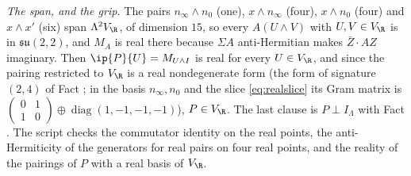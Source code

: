 \emph{The span, and the grip.} The pairs $n_{\infty}\wedge n_{0}$ (one), $x\wedge n_{\infty}$ (four), $x\wedge n_{0}$ (four) and $x\wedge x'$ (six) span $\Lambda^{2}V_{\R}$, of dimension $15$, so every $A(U\wedge V)$ with $U, V \in V_{\R}$ is in $\mathfrak{su}(2,2)$, and $M_{A}$ is real there because $\Sigma A$ anti-Hermitian makes $\bar{Z}\cdot AZ$ imaginary. Then $\ip{P}{U} = M_{U\wedge I}$ is real for every $U \in V_{\R}$, and since the pairing restricted to $V_{\R}$ is a real nondegenerate form (the form of signature $(2,4)$ of Fact ; in the basis $n_{\infty}, n_{0}$ and the slice \eqref{eq:realslice} its Gram matrix is $\left(\begin{smallmatrix} 0 & 1 \\ 1 & 0\end{smallmatrix}\right) \oplus \operatorname{diag}(1,-1,-1,-1)$), $P \in V_{\R}$. The last clause is $P \perp I_{\Lambda}$ with Fact . The script checks the commutator identity on the real points, the anti-Hermiticity of the generators for real pairs on four real points, and the reality of the pairings of $P$ with a real basis of $V_{\R}$.
